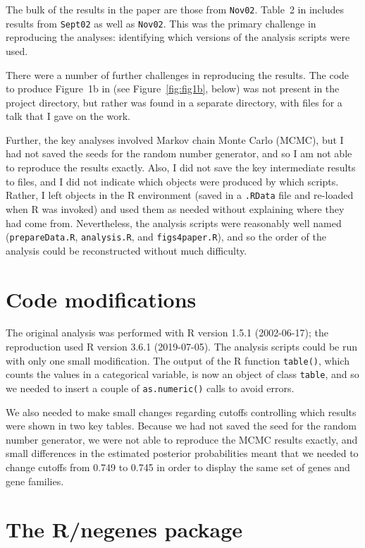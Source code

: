 The bulk of the results in the paper are those from \verb|Nov02|.
Table~2 in \citet{lamichhane2003} includes results from \verb|Sept02|
as well as \verb|Nov02|. This was the primary challenge in reproducing
the analyses: identifying which versions of the analysis
scripts were used.

There were a number of further challenges in reproducing the results.
The code to produce Figure~1b in \citet{lamichhane2003} (see
Figure~\ref{fig:fig1b}, below) was not
present in the project directory, but rather was found in a separate
directory, with files for a talk that I gave on the work.

Further, the key analyses involved Markov chain Monte Carlo (MCMC),
but I had not saved the seeds for the random number generator, and so
I am not able to reproduce the results exactly. Also, I did not save
the key intermediate results to files, and I did not indicate which
objects were produced by which scripts. Rather, I left objects in the
R environment (saved in a \verb|.RData| file and re-loaded when R was
invoked) and used them as needed without explaining where they had
come from. Nevertheless, the analysis scripts were reasonably well
named (\verb|prepareData.R|, \verb|analysis.R|,
and \verb|figs4paper.R|), and so the order of the analysis could be
reconstructed without much difficulty.

\section{Code modifications}

The original analysis was performed with R version 1.5.1 (2002-06-17);
the reproduction used R version 3.6.1 (2019-07-05). The analysis
scripts could be run with only one small modification. The output of
the R function \verb|table()|, which counts the values in a
categorical variable, is now an object of class \verb|table|, and so
we needed to insert a couple of \verb|as.numeric()| calls to avoid
errors.

We also needed to make small changes regarding cutoffs controlling which results
were shown in two key tables. Because we had not saved the seed for
the random number generator, we were not able to reproduce the MCMC
results exactly, and small differences in the estimated posterior
probabilities meant that we needed to change cutoffs from 0.749 to
0.745 in order to display the same set of genes and gene families.




\section{The R/negenes package}

